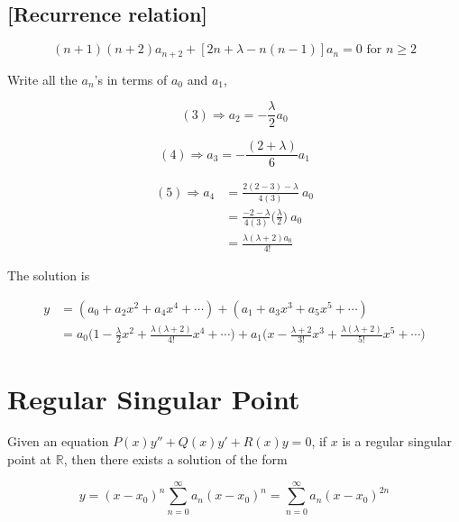 \begin{solution}
    \subsection*{[Recurrence relation]}
    \[
        (n+1)(n+2) a_{n+2} + [2n + \lambda - n(n-1)]a_n = 0 \text{ for } n \geq 2
    \]

    Write all the $a_n$'s in terms of $a_0$ and $a_1$,

    \[
        (3) \Rightarrow a_2 = -\frac{\lambda}{2} a_0
    \]

    \[
        (4) \Rightarrow a_3 = - \frac{(2 + \lambda)}{6} a_1
    \]

    \begin{align*}
        (5) \Rightarrow a_4 &= \frac{2(2-3)-\lambda}{4 (3)}\> a_0\\
        &= \frac{-2-\lambda}{4(3)} \biggl(\frac{\lambda}{2}\biggr)\> a_0\\
        &= \frac{\lambda (\lambda + 2) a_0}{4!}
    \end{align*}

    The solution is 

    \begin{align*}
        y &= (a_0 + a_2x^2 + a_4x^4 + \cdots) + (a_1 + a_3x^3 + a_5x^5 + \cdots)\\
        &= a_0 \biggl(1 - \frac{\lambda}{2}x^2 + \frac{\lambda (\lambda+2)}{4!}x^4 + \cdots\biggr) + 
        a_1 \biggl(x - \frac{\lambda + 2}{3!}x^3 + \frac{\lambda (\lambda+2)}{5!}x^5 + \cdots\biggr)
    \end{align*}

\end{solution}

\section{Regular Singular Point}

\begin{theorem}
    Given an equation $P(x)y'' + Q(x)y' + R(x)y = 0$, if $x$ is a regular singular point at $\mathbb{R}$, 
    then there exists a solution of the form 

    \[
        y = (x - x_0)^n \sum^\infty_{n=0} a_n (x-x_0)^n = \sum^\infty_{n=0} a_n (x-x_0)^{2n}
    \]
\end{theorem}

